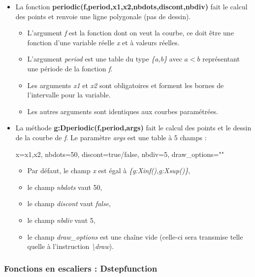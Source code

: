 \begin{itemize}
\item La fonction \textbf{periodic(f,period,x1,x2,nbdots,discont,nbdiv)} fait le calcul des points et renvoie une ligne polygonale (pas de dessin).

  \begin{itemize}
    \item L'argument \emph{f} est la fonction dont on veut la courbe, ce doit être une fonction d'une variable réelle \emph{x} et à valeurs réelles.
    \item L'argument \emph{period} est une table du type \emph{\{a,b\}} avec \(a<b\) représentant une période de la fonction \emph{f}.
    \item Les arguments \emph{x1} et \emph{x2} sont obligatoires et forment les bornes de l'intervalle pour la variable.
    \item Les autres arguments sont identiques aux courbes paramétrées.
  \end{itemize}
\item La méthode \textbf{g:Dperiodic(f,period,args)} fait le calcul des points et le dessin de la courbe de \emph{f}. Le paramètre \emph{args} est une table à 5 champs :

\begin{TeXcode}
  { x={x1,x2}, nbdots=50, discont=true/false, nbdiv=5, draw_options="" }
\end{TeXcode}

  \begin{itemize}
      \item Par défaut, le champ \emph{x} est égal à \emph{\{g:Xinf(),g:Xsup()\}},
      \item le champ \emph{nbdots} vaut 50, 
      \item le champ \emph{discont} vaut \emph{false}, 
      \item le champ \emph{nbdiv} vaut 5, 
      \item le champ \emph{draw\_options} est une chaîne vide (celle-ci sera transmise telle quelle à l'instruction \emph{\textbackslash draw}).
  \end{itemize}

\end{itemize}

\subsubsection{Fonctions en escaliers : Dstepfunction}

